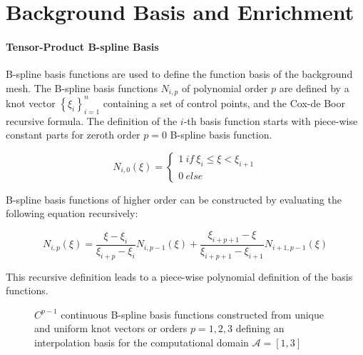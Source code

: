 \section{Background Basis and Enrichment}
\label{sec:overview_background}

\paragraph{Tensor-Product B-spline Basis}
B-spline basis functions are used to define the function basis of the background mesh. 
The B-spline basis functions $N_{i,p}$ of polynomial order $p$ are defined by a knot vector $\left\{\xi_i\right\}_{i = 1}^{n}$ containing a set of control points, and the Cox-de Boor recursive formula.  The definition of the $i$-th basis function starts with piece-wise constant parts for zeroth order $p=0$ B-spline basis function.

\vspace*{0.3cm}

\begin{equation} 
\label{eqn:BasisP0}
    N_{i,0}(\xi) = 
    \left\{
    \begin{array}{ll}1 \ if \ \xi_i \leq \xi < \xi_{i+1}\\  0\ else\end{array}
    \right.
\end{equation} 

B-spline basis functions of higher order can be constructed by evaluating the following equation recursively:
    
\begin{equation}
\label{eqn:CoxBoor}
    N_{i,p}(\xi) = 
    \frac{\xi - \xi_i}{\xi_{i+p} - \xi_i} N_{i,p-1}(\xi) + 
    \frac{\xi_{i+p+1} - \xi}{\xi_{i+p+1} - \xi_{i+1}} N_{i+1,p-1}(\xi)
\end{equation}

This recursive definition leads to a piece-wise polynomial definition of the basis functions. 

\begin{figure}[H]
    \begin{center}
    \def\svgwidth{13.0cm}
    
    \caption{$C^{p-1}$ continuous B-spline basis functions constructed from unique and uniform knot vectors or orders $p = {1,2,3}$ defining an interpolation basis for the computational domain $\mathcal{A} = [1,3]$} 
    \label{fig:Bsp_basis}
    \end{center}
\end{figure}

